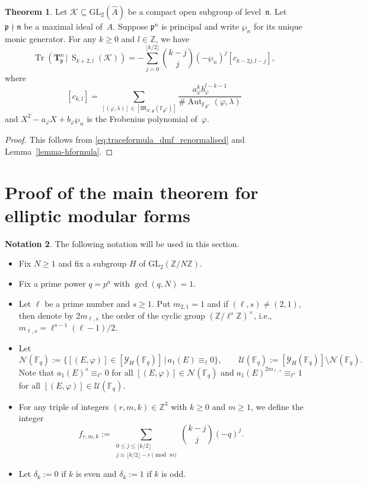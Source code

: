 \documentclass[10pt]{article}
\theoremstyle{definition}
\newtheorem{theorem}{Theorem}[section]
\newtheorem{notation}[theorem]{Notation}
\let\phi\varphi
\DeclareMathOperator\Aut{Aut}
\DeclareMathOperator\Tr{Tr}
\renewcommand{\:}{\colon}
\newcommand{\T}{\mathbf{T}}
\renewcommand{\S}{\operatorname{S}}
\newcommand{\bF}{\mathbb{F}}
\begin{document}
\begin{theorem}\label{thm:dmf_traceform_general}
    Let $\mathcal{K} \subseteq \mathrm{GL}_2(\hat{A})$ be a compact open subgroup of level~$\mathfrak n$. Let $\mathfrak p \nmid \mathfrak n$ be a maximal ideal of~$A$. Suppose $\mathfrak p^n$ is principal and write $\wp_n$ for its unique monic generator.
    For any $k \geq 0$ and $l \in \mathbb Z$, we have
    \[
    \Tr(\T^n_{\mathfrak p} \, | \, \S_{k+2,l}(\mathcal{K}) ) = -\sum_{j=0}^{\lfloor k/2 \rfloor} \binom{k - j}{j} (-\wp_n)^{j} [c_{k-2j,l-j}],
    \]
    where
    \[
    [c_{k,l}] = \sum_{[(\phi,\lambda)] \in [\mathfrak M_{\mathcal{K},\mathfrak p}(\bF_{{\mathfrak p}^n})]} \frac{a_{\phi}^{k} b_{\phi}^{l-k-1}}{\# \Aut_{\mathbb F_{\mathfrak p^n}}(\phi,\lambda)}
    \]
    and $X^2 - a_{\phi}X + b_{\phi}\wp_n$ is the Frobenius polynomial of~$\phi$.
\end{theorem}
\begin{proof}
This follows from \eqref{eq:traceformula_dmf_renormalised} and Lemma~\ref{lemma-hformula}.
\end{proof}

\section{Proof of the main theorem for elliptic modular forms}\label{sec:elliptic-proof}

\begin{notation}\label{notation1} The following notation will be used in this section.  
\begin{itemize}
\item Fix $N \geq 1$ and fix a subgroup $H$ of $\mathrm{GL}_2(\mathbb Z/N\mathbb Z)$.
\item Fix a prime power $q=p^a$ with $\gcd(q,N)=1$. 
\item 
Let $\ell$ be a prime number and $s \geq 1$. Put $m_{2,1}=1$ and if $(\ell,s)\neq (2,1)$, then denote by $2m_{\ell,s}$ the order of the cyclic group $(\mathbb Z/\ell^s\mathbb Z)^\times$, i.e., $m_{\ell,s} = \ell^{s-1}(\ell-1)/2$. 
    \item 
Let
\[
\mathcal N(\bF_q) := \{ [(E,\phi)] \in [\mathcal Y_H(\bF_q)] \, | \, a_1(E) \equiv_\ell 0 \}, \qquad \mathcal U(\bF_q) := [\mathcal Y_H(\bF_q)] \setminus \mathcal N(\bF_q).
\]
Note that $a_1(E)^s \equiv_{\ell^s} 0$ for all $[(E,\phi)] \in \mathcal N(\bF_q)$ and $a_1(E)^{2m_{\ell,s}} \equiv_{\ell^s} 1$ for all $[(E,\phi)] \in \mathcal U(\bF_q)$. 
    \item 
For any triple of integers $(r,m,k) \in \mathbb Z^3$ with $k\geq 0$ and $m \geq 1$, we define the integer  
\[
f_{r,m,k} := \sum_{\substack{0 \leq j \leq \lfloor k/2 \rfloor \\ j \equiv \lfloor k/2 \rfloor -r \pmod{m} }} \binom{k-j}{j} (-q)^{j}.
\]

    \item 
Let $\delta_k := 0$ if $k$ is even and $\delta_k := 1$ if $k$ is odd.
\end{itemize}
\end{notation}
\end{document}
